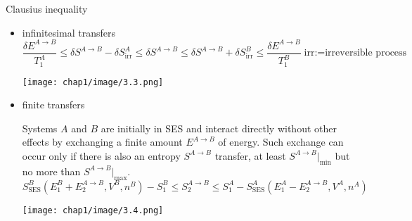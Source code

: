 \begin{thm}
    Clausius inequality
\begin{itemize}
    \item infinitesimal transfers
\[
\frac{\delta E^{A \rightarrow B}}{T_1^A} \leq \delta S^{A \rightarrow B} - \delta S_{\text{irr}}^A \leq \delta S^{A \rightarrow B} \leq \delta S^{A \rightarrow B} + \delta S_{\text{irr}}^B \leq \frac{\delta E^{A \rightarrow B}}{T_1^B}
\;\text{irr:=irreversible process}
\]
\begin{center}
    \texttt{[image: chap1/image/3.3.png]}
\end{center}
    \item finite transfers
    
    Systems \( A \) and \( B \) are initially in SES and interact directly without other effects by 
    exchanging a finite amount \( E^{A \to B} \) of energy. Such exchange can occur only if 
    there is also an entropy \( S^{A \to B} \) transfer, at least \( S^{A \to B} |_{\min} \) but 
    no more than \( S^{A \to B} |_{\max} \).
    \[
    S_{\text{SES}}^B (E_1^B + E_2^{A \to B}, V^B, n^B) - S_1^B \leq S_2^{A \to B} 
    \leq S_1^A - S_{\text{SES}}^A (E_1^A - E_2^{A \to B}, V^A, n^A)
    \]
    \begin{center}
        \texttt{[image: chap1/image/3.4.png]}
    \end{center}
\end{itemize}
\end{thm}
